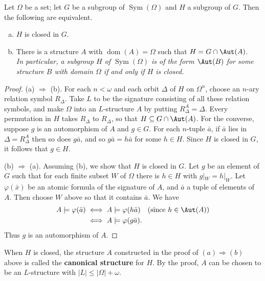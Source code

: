 \begin{theorem}
    Let $\Omega$ be a set; let $G$ be a subgroup of $\operatorname{Sym}(\Omega)$ and $H$ a subgroup of $G$. Then the following are equivalent.
    \begin{enumerate}[(a)]
        \item $H$ is closed in $G$.
        \item There is a structure $A$ with $\operatorname{dom}(A) = \Omega$ such that $H = G \cap \Aut(A)$.\\
              \textit{In particular, a subgroup $H$ of $\operatorname{Sym}(\Omega)$ is of the form $\Aut(B)$ for some structure $B$ with domain $\Omega$ if and only if $H$ is closed.}
    \end{enumerate}
\end{theorem}

\begin{proof}
    (a) $\Rightarrow$ (b). For each $n < \omega$ and each orbit $\Delta$ of $H$ on $\Omega^n$, choose an $n$-ary relation symbol $R_\Delta$. Take $L$ to be the signature consisting of all these relation symbols, and make $\Omega$ into an $L$-structure $A$ by putting $R_\Delta^A = \Delta$. Every permutation in $H$ takes $R_\Delta$ to $R_\Delta$, so that $H \subseteq G \cap \Aut(A)$. For the converse, suppose $g$ is an automorphism of $A$ and $g \in G$. For each $n$-tuple $\bar{a}$, if $\bar{a}$ lies in $\Delta = R_\Delta^A$ then so does $g\bar{a}$, and so $g\bar{a} = h\bar{a}$ for some $h \in H$. Since $H$ is closed in $G$, it follows that $g \in H$.

    (b) $\Rightarrow$ (a). Assuming (b), we show that $H$ is closed in $G$. Let $g$ be an element of $G$ such that for each finite subset $W$ of $\Omega$ there is $h \in H$ with $g|_W = h|_W$. Let $\varphi(\bar{x})$ be an atomic formula of the signature of $A$, and $\bar{a}$ a tuple of elements of $A$. Then choose $W$ above so that it contains $\bar{a}$. We have
    \[
        \begin{aligned}
            A \models \varphi(\bar{a}) & \iff A \models \varphi(h\bar{a}) \quad \text{(since } h \in \Aut(A)) \\
                                       & \iff A \models \varphi(g\bar{a}).
        \end{aligned}
    \]
    Thus $g$ is an automorphism of $A$.
\end{proof}

When $H$ is closed, the structure $A$ constructed in the proof of $(a) \Rightarrow (b)$ above is called the \textbf{canonical structure} for $H$. By the proof, $A$ can be chosen to be an $L$-structure with $|L| \leq |\Omega| + \omega$.

